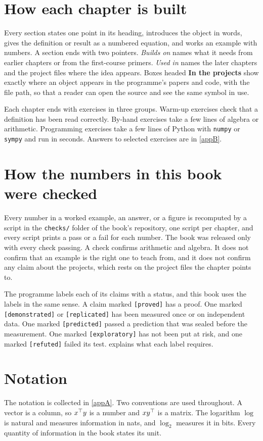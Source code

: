 \section*{How each chapter is built}

Every section states one point in its heading, introduces the object in words, gives the definition or result as a numbered equation, and works an example with numbers. A section ends with two pointers. \emph{Builds on} names what it needs from earlier chapters or from the first-course primers. \emph{Used in} names the later chapters and the project files where the idea appears. Boxes headed \textbf{In the projects} show exactly where an object appears in the programme's papers and code, with the file path, so that a reader can open the source and see the same symbol in use.

Each chapter ends with exercises in three groups. Warm-up exercises check that a definition has been read correctly. By-hand exercises take a few lines of algebra or arithmetic. Programming exercises take a few lines of Python with \texttt{numpy} or \texttt{sympy} and run in seconds. Answers to selected exercises are in \cref{appB}.

\section*{How the numbers in this book were checked}

Every number in a worked example, an answer, or a figure is recomputed by a script in the \texttt{checks/} folder of the book's repository, one script per chapter, and every script prints a pass or a fail for each number. The book was released only with every check passing. A check confirms arithmetic and algebra. It does not confirm that an example is the right one to teach from, and it does not confirm any claim about the projects, which rests on the project files the chapter points to.

The programme labels each of its claims with a status, and this book uses the labels in the same sense. A claim marked \texttt{[proved]} has a proof. One marked \texttt{[demonstrated]} or \texttt{[replicated]} has been measured once or on independent data. One marked \texttt{[predicted]} passed a prediction that was sealed before the measurement. One marked \texttt{[exploratory]} has not been put at risk, and one marked \texttt{[refuted]} failed its test.  explains what each label requires.

\section*{Notation}

The notation is collected in \cref{appA}. Two conventions are used throughout. A vector is a column, so $x^{\top} y$ is a number and $xy^{\top}$ is a matrix. The logarithm $\log$ is natural and measures information in nats, and $\log_2$ measures it in bits. Every quantity of information in the book states its unit.
